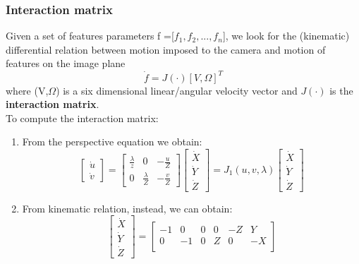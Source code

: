 \documentclass[a4paper,12pt]{article}
\begin{document}
\subsubsection{Interaction matrix}
Given a set of features parameters f =[$f_1,f_2,...,f_n$], we look 
for the (kinematic) differential relation between
motion imposed to the camera and motion of features on the
image plane \begin{equation}
\dot{f}=J(\cdot)[V, \Omega]^T
\end{equation}
where (V,$\Omega$) is a six dimensional linear/angular velocity vector and $J(\cdot)$ is the \textbf{interaction matrix}.\\
To compute the interaction matrix: \begin{enumerate}
    \item From the perspective equation we obtain:
    \begin{equation}
        \begin{bmatrix}
        \dot{u}\\
        \dot{v}
        \end{bmatrix}=
        \begin{bmatrix}
        \frac{\lambda}{z} & 0 & -\frac{u}{Z}\\
        0 & \frac{\lambda}{Z} & -\frac{v}{Z}
        \end{bmatrix}
        \begin{bmatrix}
            \dot{X}\\
            \dot{Y}\\
            \dot{Z}
        \end{bmatrix}
        =J_1(u,v,\lambda)\begin{bmatrix}
        \dot{X}\\
        \dot{Y}\\
        \dot{Z}
        \end{bmatrix}
    \end{equation}
    \item From kinematic relation, instead, we can obtain:
    \begin{equation}
        \begin{bmatrix}
        \dot{X}\\
        \dot{Y}\\
        \dot{Z}
        \end{bmatrix}=
        \begin{bmatrix}
            -1 & 0 & 0 & 0 & -Z & Y \\
            0 & -1 & 0 & Z & 0 & -X \\

\end{bmatrix}
\end{equation}
\end{enumerate}
\end{document}
